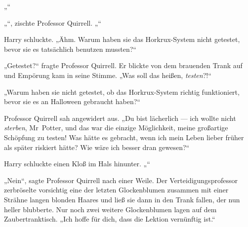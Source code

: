 „“

„“, zischte Professor Quirrell. „“

Harry schluckte.
„Ähm. Warum haben sie das Horkrux-System nicht getestet, bevor sie es tatsächlich benutzen mussten?“

„Getestet?“ fragte Professor Quirrell.
Er blickte von dem brauenden Trank auf und Empörung kam in seine Stimme.
„Was soll das heißen, \emph{testen}?!“

„Warum haben sie nicht getestet, ob das Horkrux-System richtig funktioniert, bevor sie es an Halloween gebraucht haben?“

Professor Quirrell sah angewidert aus.
„Du bist lächerlich — ich wollte nicht \emph{sterben}, Mr~Potter, und das war die einzige Möglichkeit, meine großartige Schöpfung zu testen! Was hätte es gebracht, wenn ich mein Leben lieber früher als später riskiert hätte? Wie wäre ich besser dran gewesen?“

Harry schluckte einen Kloß im Hals hinunter.
„“

„Nein“, sagte Professor Quirrell nach einer Weile.
Der Verteidigungsprofessor zerbröselte vorsichtig eine der letzten Glockenblumen zusammen mit einer Strähne langen blonden Haares und ließ sie dann in den Trank fallen, der nun heller blubberte. Nur noch zwei weitere Glockenblumen lagen auf dem Zaubertranktisch.
„Ich hoffe für dich, dass die Lektion vernünftig ist.“

